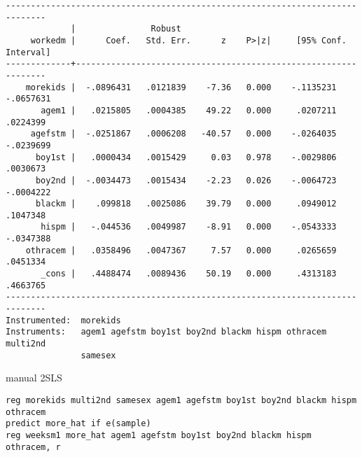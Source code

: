 \documentclass[11pt]{article}
\begin{document}
\begin{verbatim}
------------------------------------------------------------------------------
             |               Robust
     workedm |      Coef.   Std. Err.      z    P>|z|     [95% Conf. Interval]
-------------+----------------------------------------------------------------
    morekids |  -.0896431   .0121839    -7.36   0.000    -.1135231   -.0657631
       agem1 |   .0215805   .0004385    49.22   0.000     .0207211    .0224399
     agefstm |  -.0251867   .0006208   -40.57   0.000    -.0264035   -.0239699
      boy1st |   .0000434   .0015429     0.03   0.978    -.0029806    .0030673
      boy2nd |  -.0034473   .0015434    -2.23   0.026    -.0064723   -.0004222
      blackm |    .099818   .0025086    39.79   0.000     .0949012    .1047348
       hispm |   -.044536   .0049987    -8.91   0.000    -.0543333   -.0347388
    othracem |   .0358496   .0047367     7.57   0.000     .0265659    .0451334
       _cons |   .4488474   .0089436    50.19   0.000     .4313183    .4663765
------------------------------------------------------------------------------
Instrumented:  morekids
Instruments:   agem1 agefstm boy1st boy2nd blackm hispm othracem multi2nd
               samesex
\end{verbatim}

manual 2SLS
\begin{verbatim}
reg morekids multi2nd samesex agem1 agefstm boy1st boy2nd blackm hispm othracem
predict more_hat if e(sample)
reg weeksm1 more_hat agem1 agefstm boy1st boy2nd blackm hispm othracem, r
\end{verbatim}
\end{document}
